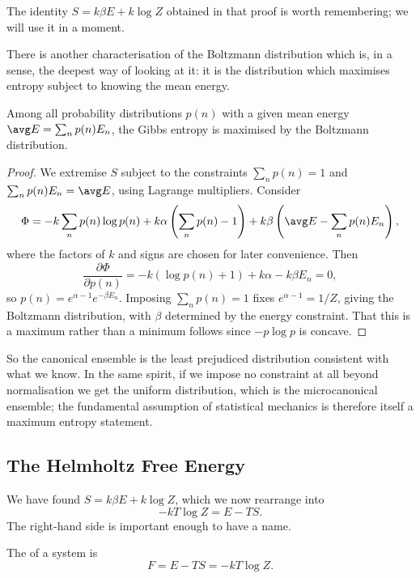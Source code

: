 The identity $S = k\beta E + k\log Z$ obtained in that proof is worth remembering; we will use it in a moment.

There is another characterisation of the Boltzmann distribution which is, in a sense, the deepest way of looking at it: it is the distribution which maximises entropy subject to knowing the mean energy.

\begin{proposition}
	Among all probability distributions $p(n)$ with a given mean energy $\avg E = \sum_n p(n) E_n$, the Gibbs entropy is maximised by the Boltzmann distribution.
\end{proposition}
\begin{proof}
	We extremise $S$ subject to the constraints $\sum_n p(n) = 1$ and $\sum_n p(n) E_n = \avg E$, using Lagrange multipliers. Consider
	$$
	\Phi = -k\sum_n p(n) \log p(n) + k\alpha\left(\sum_n p(n) - 1\right) + k\beta\left(\avg E - \sum_n p(n)E_n\right),
	$$
	where the factors of $k$ and signs are chosen for later convenience. Then
	$$
	\frac{\partial \Phi}{\partial p(n)} = -k\left(\log p(n) + 1\right) + k\alpha - k\beta E_n = 0,
	$$
	so $p(n) = e^{\alpha - 1}e^{-\beta E_n}$. Imposing $\sum_n p(n) = 1$ fixes $e^{\alpha - 1} = 1/Z$, giving the Boltzmann distribution, with $\beta$ determined by the energy constraint. That this is a maximum rather than a minimum follows since $-p\log p$ is concave.
\end{proof}

So the canonical ensemble is the least prejudiced distribution consistent with what we know. In the same spirit, if we impose no constraint at all beyond normalisation we get the uniform distribution, which is the microcanonical ensemble; the fundamental assumption of statistical mechanics is therefore itself a maximum entropy statement.

\subsection{The Helmholtz Free Energy}

We have found $S = k\beta E + k \log Z$, which we now rearrange into
$$
-kT\log Z = E - TS.
$$
The right-hand side is important enough to have a name.

\begin{definition}
	The  of a system is
	$$
	F = E - TS = -kT\log Z.
	$$
\end{definition}

